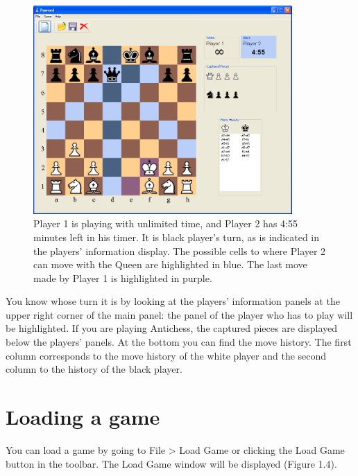 \documentclass{report}
\begin{document}
				\begin{figure}
					\begin{center}
						\includegraphics[width=280pt]{img/in-game-1.png}
							\caption{Player 1 is playing with unlimited time, and Player 2 has 4:55 
											minutes left in his timer. It is black player's turn, as is 
											indicated in the players' information display. The possible cells
								      to where Player 2 can move with the Queen are highlighted in blue.
								      The last move made by Player 1 is highlighted in purple.}
					\end{center}
				\end{figure}
			
			You know whose turn it is by looking at the players' information panels at 
			the upper right corner of the main panel: the panel of the player who has
			to play will be highlighted. If you are playing Antichess, the captured 
			pieces are displayed below the players' panels.  At the bottom you can 
			find the move history. The first column corresponds to the move history of 
			the white player and the second column to the history of the black player.
			
			\section{Loading a game}
			
			You can load a game by going to File > Load Game or clicking the Load Game
			button in the toolbar. The Load Game window will be displayed (Figure 1.4).
			
\end{document}
